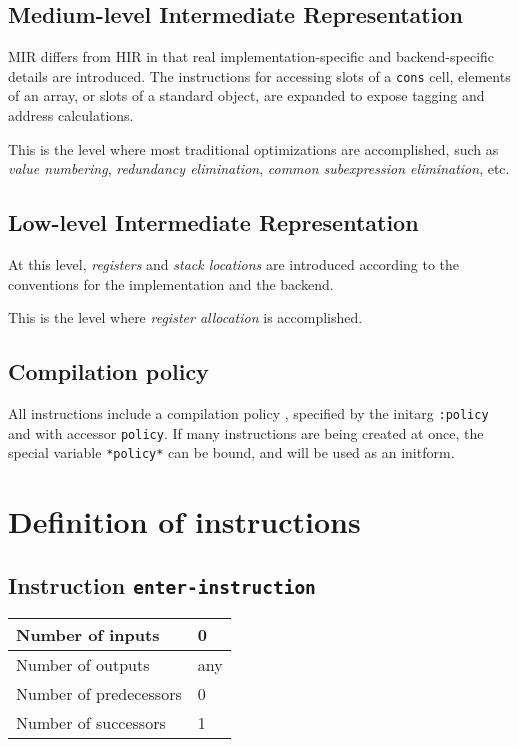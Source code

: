 \subsection{Medium-level Intermediate Representation}

MIR differs from HIR in that real implementation-specific and
backend-specific details are introduced.  The instructions for
accessing slots of a \texttt{cons} cell, elements of an array, or
slots of a standard object, are expanded to expose tagging and address
calculations.

This is the level where most traditional optimizations are
accomplished, such as \emph{value numbering}, \emph{redundancy
  elimination}, \emph{common subexpression elimination}, etc.

\subsection{Low-level Intermediate Representation}

At this level, \emph{registers} and \emph{stack locations} are
introduced according to the conventions for the implementation and the
backend.

This is the level where \emph{register allocation} is accomplished.

\subsection{Compilation policy}

All instructions include a compilation policy ,
specified by the initarg \texttt{:policy} and with accessor
\texttt{policy}. If many instructions are being created at once, the
special variable \texttt{*policy*} can be bound, and will be used
as an initform.

\section{Definition of instructions}
\label{sec-ir-instructions}

\subsection{Instruction \texttt{enter-instruction}}
\label{hir-instruction-enter}

\begin{tabular}{|l|l|}
\hline
Number of inputs & 0\\
\hline
Number of outputs & any\\
\hline
Number of predecessors & 0\\
\hline
Number of successors & 1\\
\hline
\end{tabular}

